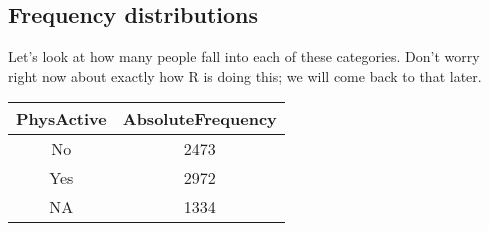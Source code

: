 \documentclass[]{book}
\newenvironment{Shaded}{\begin{snugshade}}{\end{snugshade}}
\newcommand{\KeywordTok}[1]{\textcolor[rgb]{0.13,0.29,0.53}{\textbf{#1}}}
\newcommand{\DataTypeTok}[1]{\textcolor[rgb]{0.13,0.29,0.53}{#1}}
\newcommand{\StringTok}[1]{\textcolor[rgb]{0.31,0.60,0.02}{#1}}
\newcommand{\CommentTok}[1]{\textcolor[rgb]{0.56,0.35,0.01}{\textit{#1}}}
\newcommand{\OperatorTok}[1]{\textcolor[rgb]{0.81,0.36,0.00}{\textbf{#1}}}
\newcommand{\NormalTok}[1]{#1}
\theoremstyle{definition}
\theoremstyle{definition}
\theoremstyle{definition}
\theoremstyle{remark}
\begin{document}
\subsection{Frequency distributions}\label{frequency-distributions}

Let's look at how many people fall into each of these categories. Don't
worry right now about exactly how R is doing this; we will come back to
that later.

\begin{Shaded}
\end{Shaded}

\begin{longtable}[]{@{}cc@{}}
\toprule
\begin{minipage}[b]{0.17\columnwidth}\centering\strut
PhysActive\strut
\end{minipage} & \begin{minipage}[b]{0.25\columnwidth}\centering\strut
AbsoluteFrequency\strut
\end{minipage}\tabularnewline
\midrule
\endhead
\begin{minipage}[t]{0.17\columnwidth}\centering\strut
No\strut
\end{minipage} & \begin{minipage}[t]{0.25\columnwidth}\centering\strut
2473\strut
\end{minipage}\tabularnewline
\begin{minipage}[t]{0.17\columnwidth}\centering\strut
Yes\strut
\end{minipage} & \begin{minipage}[t]{0.25\columnwidth}\centering\strut
2972\strut
\end{minipage}\tabularnewline
\begin{minipage}[t]{0.17\columnwidth}\centering\strut
NA\strut
\end{minipage} & \begin{minipage}[t]{0.25\columnwidth}\centering\strut
1334\strut
\end{minipage}\tabularnewline
\bottomrule
\end{longtable}
\end{document}
